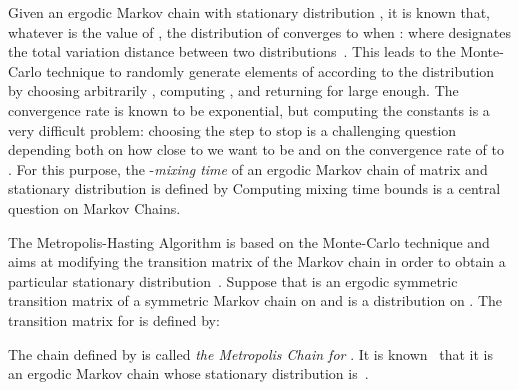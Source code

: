 Given an ergodic Markov chain  with stationary
distribution , it is known that, whatever is the value of , the
distribution of  converges to  when :
 where 
designates the total variation distance between two
distributions~\cite[Chapter~4]{mixing}. This leads to the Monte-Carlo
technique to randomly generate elements of  according to the
distribution  by choosing arbitrarily , computing , and
returning  for  large enough. The convergence rate is known to be
exponential, but computing the constants is a very difficult problem: choosing
the step  to stop is a challenging question depending both on how close to
 we want to be and on the convergence rate of  to .
For this purpose, the -{\it mixing time} of an ergodic Markov
chain of matrix  and stationary distribution  is defined by 
Computing mixing time bounds is a central question on Markov Chains.

The Metropolis-Hasting Algorithm is based on the Monte-Carlo technique and
aims at modifying the transition matrix of the Markov chain in order to
obtain a particular stationary distribution~\cite[Chapter 3]{mixing}.
Suppose that  is an ergodic symmetric transition matrix of a symmetric
Markov chain on  and  is a distribution on . The
transition matrix  for  is defined by:



The chain defined by  is called {\it the Metropolis Chain for }.
It is known~\cite[Chapter 3]{mixing} that it is an ergodic Markov chain
whose stationary distribution is~.


